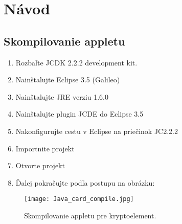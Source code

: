 \documentclass[12pt,a4wide,oneside,openright]{report}
\begin{document}




\chapter{Návod} \label{s_manual}
 
\section{Skompilovanie appletu} \label{s_applet_compile}

	\begin{enumerate}
		\item Rozbaľte JCDK 2.2.2 development kit.
		\item Nainštalujte Eclipse 3.5 (Galileo)
		\item Nainštalujte JRE verziu 1.6.0
		\item Nainštalujte plugin JCDE do Eclipse 3.5
		\item Nakonfigurujte cestu v Eclipse na priečinok JC2.2.2
		\item Importnite projekt
		\item Otvorte projekt
		\item Ďalej pokračujte podľa postupu na obrázku:
	\end{enumerate}
	
	\begin{figure*}[h]
		\centering
		\texttt{[image: Java\_card\_compile.jpg]}
		\caption{Skompilovanie appletu pre kryptoelement.}
		\label{f:applet_compile}
	\end{figure*}
	
\end{document}
